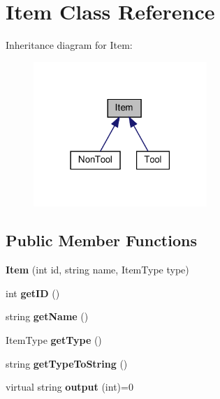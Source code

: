 \hypertarget{classItem}{}\section{Item Class Reference}
\label{classItem}


Inheritance diagram for Item\+:
\nopagebreak
\begin{figure}[H]
\begin{center}
\leavevmode
\includegraphics[width=186pt]{classItem__inherit__graph}
\end{center}
\end{figure}
\subsection*{Public Member Functions}
\begin{DoxyCompactItemize}
\item 
\mbox{\label{classItem_ac909c537a0cc1e16cc8a20b5a31e8ae7}} 
{\bfseries Item} (int id, string name, Item\+Type type)
\item 
\mbox{\label{classItem_a73c0ea2b51684e195f886c269b841434}} 
int {\bfseries get\+ID} ()
\item 
\mbox{\label{classItem_a63d7f2148b699e539aae354b01559811}} 
string {\bfseries get\+Name} ()
\item 
\mbox{\label{classItem_a4a649a87af64ef21c82fbff3c203cb41}} 
Item\+Type {\bfseries get\+Type} ()
\item 
\mbox{\label{classItem_a6b049623f6561d8da1cd6739f7b4f87c}} 
string {\bfseries get\+Type\+To\+String} ()
\item 
\mbox{\label{classItem_a145525994415170e36651e7ef1dee8ef}} 
virtual string {\bfseries output} (int)=0
\end{DoxyCompactItemize}
